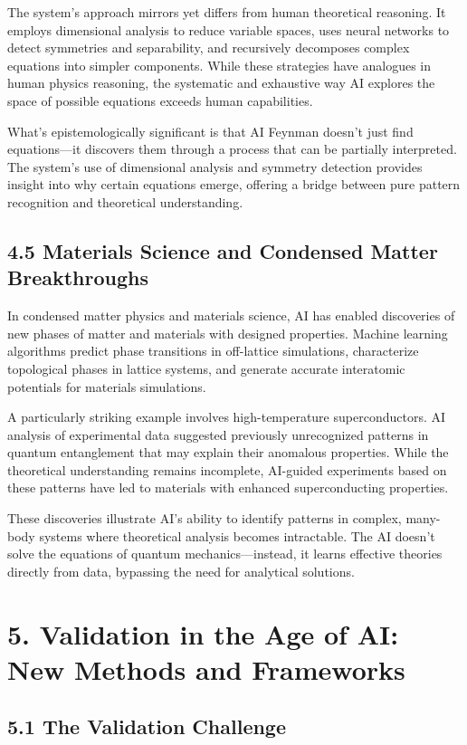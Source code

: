 \documentclass{article}
\begin{document}
The system's approach mirrors yet differs from human theoretical reasoning. It employs dimensional analysis to reduce variable spaces, uses neural networks to detect symmetries and separability, and recursively decomposes complex equations into simpler components. While these strategies have analogues in human physics reasoning, the systematic and exhaustive way AI explores the space of possible equations exceeds human capabilities.


What's epistemologically significant is that AI Feynman doesn't just find equations—it discovers them through a process that can be partially interpreted. The system's use of dimensional analysis and symmetry detection provides insight into why certain equations emerge, offering a bridge between pure pattern recognition and theoretical understanding.


\subsection{4.5 Materials Science and Condensed Matter Breakthroughs}

In condensed matter physics and materials science, AI has enabled discoveries of new phases of matter and materials with designed properties. Machine learning algorithms predict phase transitions in off-lattice simulations, characterize topological phases in lattice systems, and generate accurate interatomic potentials for materials simulations.


A particularly striking example involves high-temperature superconductors. AI analysis of experimental data suggested previously unrecognized patterns in quantum entanglement that may explain their anomalous properties. While the theoretical understanding remains incomplete, AI-guided experiments based on these patterns have led to materials with enhanced superconducting properties.


These discoveries illustrate AI's ability to identify patterns in complex, many-body systems where theoretical analysis becomes intractable. The AI doesn't solve the equations of quantum mechanics—instead, it learns effective theories directly from data, bypassing the need for analytical solutions.


\section{5. Validation in the Age of AI: New Methods and Frameworks}

\subsection{5.1 The Validation Challenge}
\end{document}
